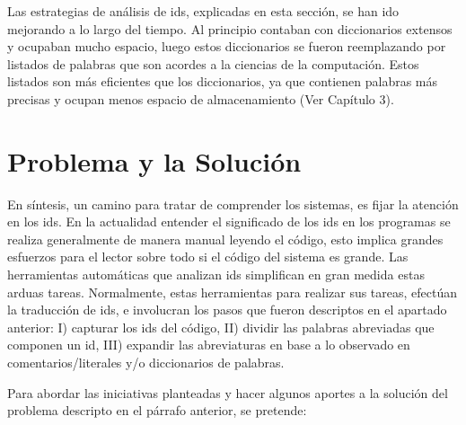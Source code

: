 Las estrategias de análisis de ids, explicadas en esta sección, se han ido mejorando a lo largo del tiempo. Al principio contaban con diccionarios extensos y ocupaban mucho espacio, luego estos diccionarios se fueron reemplazando por listados de palabras que son acordes a la ciencias de la computación. Estos listados son más eficientes que los diccionarios, ya que contienen palabras más precisas y ocupan menos espacio de almacenamiento (Ver Capítulo 3).

\section{Problema y la Solución}

En síntesis, un camino para tratar de comprender los sistemas, es fijar la atención en los ids. En la actualidad entender el significado de los ids en los programas se realiza generalmente de manera manual leyendo el código, esto implica grandes esfuerzos para el lector sobre todo si el código del sistema es grande. Las herramientas automáticas que analizan ids simplifican en gran medida estas arduas tareas. 
Normalmente, estas herramientas para realizar sus tareas, efectúan la traducción de ids, e involucran los pasos que fueron descriptos en el apartado anterior: I) capturar los ids del código, II) dividir las palabras abreviadas que componen un id, III) expandir las abreviaturas en base a lo observado en comentarios/literales y/o diccionarios de palabras. 

Para abordar las iniciativas planteadas y hacer algunos aportes a la solución del problema descripto en el párrafo anterior, se pretende:

